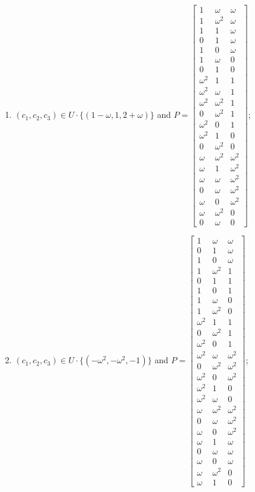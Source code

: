 \begin{enumerate}
\item[(f96)\,\newitem] $(c_1,c_2,c_3)\in U\cdot\{(1-\omega,1,2+\omega)\}$ and $P=\begin{bmatrix}1&\omega&\omega\\1&\omega^2&\omega\\1&1&\omega\\0&1&\omega\\1&0&\omega\\1&\omega&0\\0&1&0\\\omega^2&1&1\\\omega^2&\omega&1\\\omega^2&\omega^2&1\\0&\omega^2&1\\\omega^2&0&1\\\omega^2&1&0\\0&\omega^2&0\\\omega&\omega^2&\omega^2\\\omega&1&\omega^2\\\omega&\omega&\omega^2\\0&\omega&\omega^2\\\omega&0&\omega^2\\\omega&\omega^2&0\\0&\omega&0\end{bmatrix}$;
\item[(f97)\,\newitem] $(c_1,c_2,c_3)\in U\cdot\{(-\omega^2,-\omega^2,-1)\}$ and $P=\begin{bmatrix}1&\omega&\omega\\0&1&\omega\\1&0&\omega\\1&\omega^2&1\\0&1&1\\1&0&1\\1&\omega&0\\1&\omega^2&0\\\omega^2&1&1\\0&\omega^2&1\\\omega^2&0&1\\\omega^2&\omega&\omega^2\\0&\omega^2&\omega^2\\\omega^2&0&\omega^2\\\omega^2&1&0\\\omega^2&\omega&0\\\omega&\omega^2&\omega^2\\0&\omega&\omega^2\\\omega&0&\omega^2\\\omega&1&\omega\\0&\omega&\omega\\\omega&0&\omega\\\omega&\omega^2&0\\\omega&1&0\end{bmatrix}$;

\end{enumerate}

